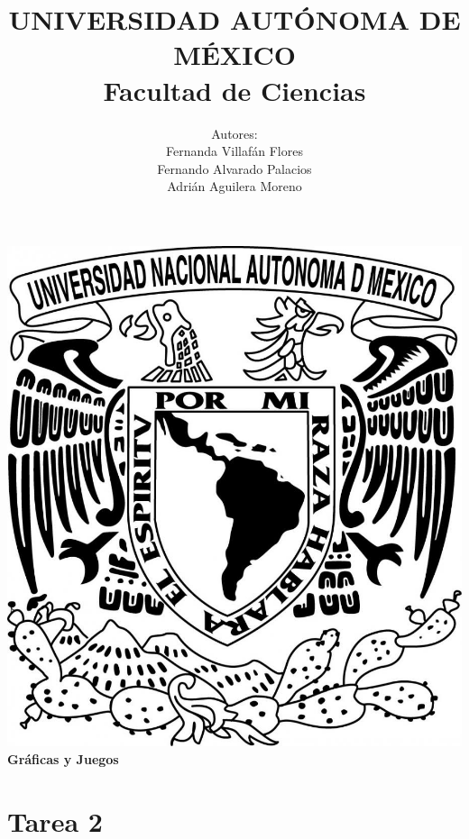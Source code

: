 \documentclass{article}
\begin{document}
  \title{UNIVERSIDAD AUT\'ONOMA DE M\'EXICO\\ Facultad de Ciencias}
  \author{Autores:
    \\ Fernanda Villaf\'an Flores
    \\ Fernando Alvarado Palacios
    \\ Adri\'an Aguilera Moreno}
  \date{}
  \maketitle
  \begin{center}
    \includegraphics[scale=0.20]{../Imagen/Portada.jpg}\\[0.4cm]
    \Large
    \bf{Gr\'aficas y Juegos}
    \normalsize
  \end{center}
  \newpage
  \section*{\LARGE{Tarea 2}}
\end{document}

